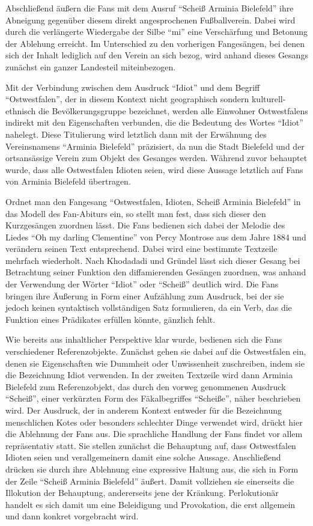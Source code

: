 Abschließend äußern die Fans mit dem Ausruf "`Scheiß Arminia Bielefeld"' ihre Abneigung gegenüber diesem direkt angesprochenen Fußballverein.
Dabei wird durch die verlängerte Wiedergabe der Silbe "`mi"' eine Verschärfung und Betonung der Ablehung erreicht.
Im Unterschied zu den vorherigen Fangesängen, bei denen sich der Inhalt lediglich auf den Verein an sich bezog, wird anhand dieses Gesangs zunächst ein ganzer Landesteil miteinbezogen.

Mit der Verbindung zwischen dem Ausdruck "`Idiot"' und dem Begriff "`Ostwestfalen"', der in diesem Kontext nicht geographisch sondern kulturell-ethnisch die Bevölkerungsgruppe bezeichnet, werden alle Einwohner Ostwestfalens indirekt mit den Eigenschaften verbunden, die die Bedeutung des Wortes "`Idiot"' nahelegt.
Diese Titulierung wird letztlich dann mit der Erwähnung des Vereinsnamens "`Arminia Bielefeld"' präzisiert, da nun die Stadt Bielefeld und der ortsansässige Verein zum Objekt des Gesanges werden.
Während zuvor behauptet wurde, dass alle Ostwestfalen Idioten seien, wird diese Aussage letztlich auf Fans von Arminia Bielefeld übertragen.

Ordnet man den Fangesang "`Ostwestfalen, Idioten, Scheiß Arminia Bielefeld"' in das Modell des Fan-Abiturs ein, so stellt man fest, dass sich dieser den Kurzgesängen zuordnen lässt.
Die Fans bedienen sich dabei der Melodie des Liedes "`Oh my darling Clementine"' von Percy Montrose aus dem Jahre 1884 und verändern seinen Text entsprechend.
Dabei wird eine bestimmte Textzeile mehrfach wiederholt.
Nach Khodadadi und Gründel lässt sich dieser Gesang bei Betrachtung seiner Funktion den diffamierenden Gesängen zuordnen, was anhand der Verwendung der Wörter "`Idiot"' oder "`Scheiß"' deutlich wird.
Die Fans bringen ihre Äußerung in Form einer Aufzählung zum Ausdruck, bei der sie jedoch keinen syntaktisch vollständigen Satz formulieren, da ein Verb, das die Funktion eines Prädikates erfüllen könnte, gänzlich fehlt.

Wie bereits aus inhaltlicher Perspektive klar wurde, bedienen sich die Fans verschiedener Referenzobjekte.
Zunächst gehen sie dabei auf die Ostwestfalen ein, denen sie Eigenschaften wie Dummheit oder Unwissenheit zuschreiben, indem sie die Bezeichnung Idiot verwenden.
In der zweiten Textzeile wird dann Arminia Bielefeld zum Referenzobjekt, das durch den vorweg genommenen Ausdruck "`Scheiß"', einer verkürzten Form des Fäkalbegriffes "`Scheiße"', näher beschrieben wird.
Der Ausdruck, der in anderem Kontext entweder für die Bezeichnung menschlichen Kotes oder besonders schlechter Dinge verwendet wird, drückt hier die Ablehnung der Fans aus.
Die sprachliche Handlung der Fans findet vor allem repräsentativ statt.
Sie stellen zunächst die Behauptung auf, dass Ostwestfalen Idioten seien und verallgemeinern damit eine solche Aussage.
Anschließend drücken sie durch ihre Ablehnung eine expressive Haltung aus, die sich in Form der Zeile "`Scheiß Arminia Bielefeld"' äußert.
Damit vollziehen sie einerseits die Illokution der Behauptung, andererseits jene der Kränkung.
Perlokutionär handelt es sich damit um eine Beleidigung und Provokation, die erst allgemein und dann konkret vorgebracht wird.

